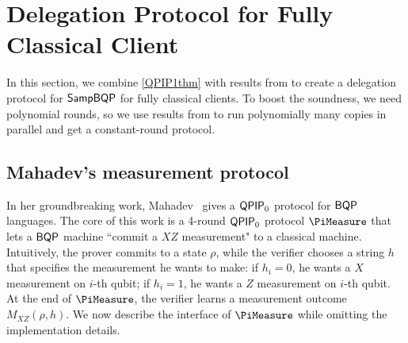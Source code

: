 \section{Delegation Protocol for Fully Classical Client}



In this section, we combine \cref{QPIP1thm} with results from \cite{FOCS:Mahadev18a} to create a delegation protocol for $\operatorname{\mathsf{SampBQP}}$ for fully classical clients. To boost the soundness, we need  polynomial  rounds, so we use results from \cite{parallelrep} to run polynomially many copies in parallel and get a constant-round protocol.






\subsection{Mahadev's measurement protocol}

In her groundbreaking work, Mahadev~\cite{FOCS:Mahadev18a} gives a $\operatorname{\mathsf{QPIP}}_0$ protocol for $\operatorname{\mathsf{BQP}}$ languages.
The core of this work is a 4-round $\operatorname{\mathsf{QPIP}}_0$ protocol $\PiMeasure$ that lets a $\operatorname{\mathsf{BQP}}$ machine ``commit a $XZ$ measurement" to a classical machine.
Intuitively, the prover commits to a state $\rho$, while
the verifier chooses a string $h$ that specifies the measurement he wants to make: if $h_i=0$, he wants a $X$ measurement on $i$-th qubit; if $h_i=1$, he wants a $Z$ measurement on $i$-th qubit.
At the end of $\PiMeasure$, the verifier learns a measurement outcome $M_{XZ}(\rho, h)$.
We now describe the interface of $\PiMeasure$ while omitting the implementation details.


